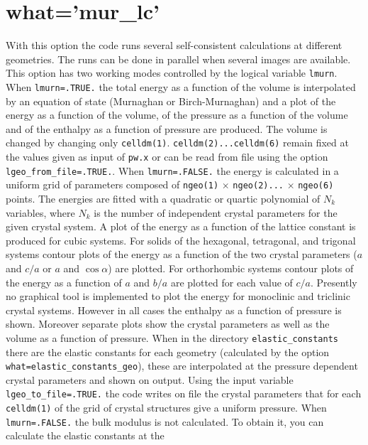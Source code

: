 \documentclass[12pt,a4paper,twoside]{report}
\begin{document}
\newpage
{\color{coral}\section{what='mur\_lc'}}
\color{black}
With this option the code runs several self-consistent calculations
at different geometries. The runs can be done in parallel when several images 
are available. This option has two working modes controlled by the 
logical variable \texttt{lmurn}. When \texttt{lmurn=.TRUE.} the total energy as 
a function of the volume is interpolated by an equation of state
(Murnaghan or Birch-Murnaghan) and 
a plot of the energy as a function of the volume, of the pressure 
as a function of the volume and of the enthalpy as a function of
pressure are produced. The volume is changed by 
changing only \texttt{celldm(1)}. \texttt{celldm(2)...celldm(6)} remain fixed
at the values given as input of \texttt{pw.x} or can be read from file
using the option \texttt{lgeo\_from\_file=.TRUE.}. 
When \texttt{lmurn=.FALSE.} the energy is calculated in a uniform
grid of parameters composed of \texttt{ngeo(1)} $\times$ \texttt{ngeo(2)...}
$\times$ \texttt{ngeo(6)} points.
The energies are fitted with a quadratic or quartic polynomial of
$N_k$ variables, where $N_k$ is the number of independent crystal
parameters for the given crystal system. A plot of the energy as 
a function of the lattice constant is produced for cubic systems.
For solids of the hexagonal, tetragonal, and trigonal systems
contour plots of the energy as a function of the two crystal parameters
($a$ and $c/a$ or $a$ and $\cos\alpha$)
are plotted. For orthorhombic systems contour plots of the energy as a function
of $a$ and $b/a$ are plotted for each value of $c/a$. 
Presently no graphical tool is implemented to plot the energy
for monoclinic and triclinic crystal systems. However in all cases
the enthalpy as a function of pressure is shown. Moreover
separate plots show the crystal parameters as well as the volume as 
a function of pressure. When in the directory \texttt{elastic\_constants}
there are the elastic constants for each geometry (calculated by the option
\texttt{what=elastic\_constants\_geo}), these are interpolated
at the pressure dependent crystal parameters and shown on output.
Using the input variable \texttt{lgeo\_to\_file=.TRUE.} the code writes
on file the crystal parameters that for each \texttt{celldm(1)} 
of the grid of crystal structures give a uniform pressure.
When \texttt{lmurn=.FALSE.} the bulk modulus
is not calculated. To obtain it, you can calculate the elastic constants at the
\end{document}
